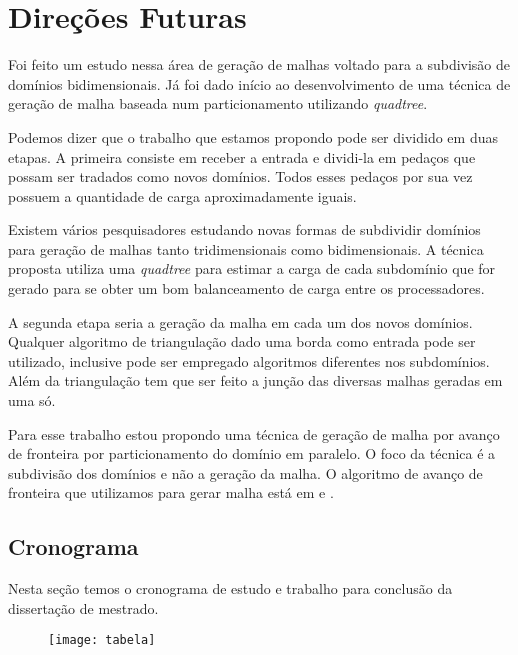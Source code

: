 \pagestyle{empty}
\cleardoublepage
\pagestyle{fancy}
\chapter{Direções Futuras}\label{cap4}

Foi feito um estudo nessa área de geração de malhas voltado para a subdivisão de domínios bidimensionais. Já foi dado início ao desenvolvimento de uma técnica de geração de malha baseada num particionamento utilizando \textit{quadtree}.

Podemos dizer que o trabalho que estamos propondo pode ser dividido em duas etapas. A primeira consiste em receber a entrada e dividi-la em pedaços que possam ser tradados como novos domínios. Todos esses pedaços por sua vez possuem a quantidade de carga aproximadamente iguais.

Existem vários pesquisadores estudando novas formas de subdividir domínios para geração de malhas tanto tridimensionais como bidimensionais. A técnica proposta utiliza uma \textit{quadtree} para estimar a carga de cada subdomínio que for gerado para se obter um bom balanceamento de carga entre os processadores.

A segunda etapa seria a geração da malha em cada um dos novos domínios. Qualquer algoritmo de triangulação dado uma borda como entrada pode ser utilizado, inclusive pode ser empregado algoritmos diferentes nos subdomínios. Além da triangulação tem que ser feito a junção das diversas malhas geradas em uma só.

Para esse trabalho estou propondo uma técnica de geração de malha por avanço de fronteira por particionamento do domínio em paralelo. O foco da técnica é a subdivisão dos domínios e não a geração da malha. O algoritmo de avanço de fronteira que utilizamos para gerar malha está em \cite{bib:Miranda99} e \cite{bib:Cavalcante-Neto01}.

\section{Cronograma}
Nesta seção temos o cronograma de estudo e trabalho para conclusão da dissertação de mestrado.

 \begin{figure}[htbp]
     \begin{center}
     \texttt{[image: tabela]}
     \label{fig:tabela}
     \end{center}
 \end{figure}